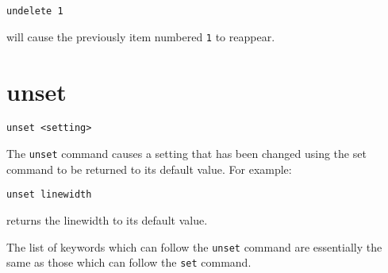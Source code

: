 \begin{verbatim}
undelete 1
\end{verbatim}

\noindent will cause the previously item numbered {\tt 1} to reappear.
  
\section{unset}

\begin{verbatim}
unset <setting>
\end{verbatim}

The {\tt unset} command causes a setting that has been changed using the set
command to be returned to its default value.  For example:

\begin{verbatim}
unset linewidth
\end{verbatim}

\noindent returns the linewidth to its default value.

The list of keywords which can follow the {\tt unset} command are essentially
the same as those which can follow the {\tt set} command.
